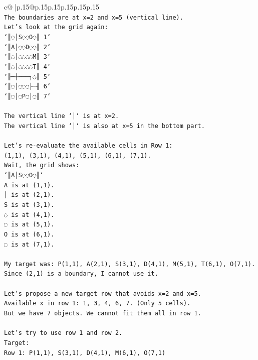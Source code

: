 \documentclass{article}
\begin{document}
{\begin{supertabular}{c@{$\;$}|p{.15\linewidth}@{}p{.15\linewidth}p{.15\linewidth}p{.15\linewidth}p{.15\linewidth}p{.15\linewidth}}
{{{\\ 
\texttt{The boundaries are at x=2 and x=5 (vertical line).} \\
\texttt{Let's look at the grid again:} \\
\texttt{`║◌│S◌◌O◌║ 1`} \\
\texttt{`║A│◌◌D◌◌║ 2`} \\
\texttt{`║◌│◌◌◌◌M║ 3`} \\
\texttt{`║◌│◌◌◌◌T║ 4`} \\
\texttt{`╟─┼───┐◌║ 5`} \\
\texttt{`║◌│◌◌◌├─╢ 6`} \\
\texttt{`║◌│◌P◌│◌║ 7`} \\
\\ 
\texttt{The vertical line `│` is at x=2.} \\
\texttt{The vertical line `│` is also at x=5 in the bottom part.} \\
\\ 
\texttt{Let's re{-}evaluate the available cells in Row 1:} \\
\texttt{(1,1), (3,1), (4,1), (5,1), (6,1), (7,1).} \\
\texttt{Wait, the grid shows:} \\
\texttt{`║A│S◌◌O◌║`} \\
\texttt{A is at (1,1).} \\
\texttt{│ is at (2,1).} \\
\texttt{S is at (3,1).} \\
\texttt{◌ is at (4,1).} \\
\texttt{◌ is at (5,1).} \\
\texttt{O is at (6,1).} \\
\texttt{◌ is at (7,1).} \\
\\ 
\texttt{My target was: P(1,1), A(2,1), S(3,1), D(4,1), M(5,1), T(6,1), O(7,1).} \\
\texttt{Since (2,1) is a boundary, I cannot use it.} \\
\\ 
\texttt{Let's propose a new target row that avoids x=2 and x=5.} \\
\texttt{Available x in row 1: 1, 3, 4, 6, 7. (Only 5 cells).} \\
\texttt{But we have 7 objects. We cannot fit them all in row 1.} \\
\\ 
\texttt{Let's try to use row 1 and row 2.} \\
\texttt{Target:} \\
\texttt{Row 1: P(1,1), S(3,1), D(4,1), M(6,1), O(7,1)} \\
}}}
\end{supertabular}}
\end{document}
